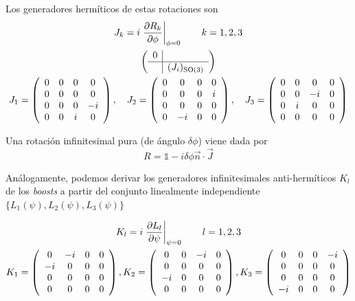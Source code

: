 Los generadores hermíticos de estas rotaciones son
\begin{gather}
J_k=i\left.\frac{\partial R_k}{\partial\phi}\right|_{\phi=0}\qquad k=1,2,3\\
\left(\begin{array}{c|c}
0&\\
\hline
& (J_i)_{\mathrm{SO}(3)}
\end{array}\right)\\
J_{1}=\left(\begin{array}{cccc}{0} & {0} & {0} & {0} \\ {0} & {0} & {0} & {0} \\ {0} & {0} & {0} & {-i} \\ {0} & {0} & {i} & {0}\end{array}\right), \quad J_{2}=\left(\begin{array}{cccc}{0} & {0} & {0} & {0} \\ {0} & {0} & {0} & {i} \\ {0} & {0} & {0} & {0} \\ {0} & {-i} & {0} & {0}\end{array}\right), \quad J_{3}=\left(\begin{array}{cccc}{0} & {0} & {0} & {0} \\ {0} & {0} & {-i} & {0} \\ {0} & {i} & {0} & {0} \\ {0} & {0} & {0} & {0}\end{array}\right)
\end{gather}

Una rotación infinitesimal pura (de ángulo $\delta\phi$) viene dada por
\begin{equation}
R=\mathbb{1}-i\delta\phi\vec{n}\cdot\vec{J}
\end{equation}


Análogamente, podemos derivar los generadores infinitesimales anti-hermíticos $K_l$ de los \emph{boosts} a partir del conjunto linealmente independiente $\{L_1(\psi),L_2(\psi),L_3(\psi)\}$

\begin{gather}
K_l=i\left. \frac{\partial L_l}{\partial\psi}\right|_{\psi=0}\qquad l=1,2,3\\
K_{1}=\left(\begin{array}{cccc}{0} & {-i} & {0} & {0} \\ {-i} & {0} & {0} & {0} \\ {0} & {0} & {0} & {0} \\ {0} & {0} & {0} & {0}\end{array}\right), K_{2}=\left(\begin{array}{cccc}{0} & {0} & {-i} & {0} \\ {0} & {0} & {0} & {0} \\ {-i} & {0} & {0} & {0} \\ {0} & {0} & {0} & {0}\end{array}\right), K_{3}=\left(\begin{array}{cccc}{0} & {0} & {0} & {-i} \\ {0} & {0} & {0} & {0} \\ {0} & {0} & {0} & {0} \\ {-i} & {0} & {0} & {0}\end{array}\right)
\end{gather}

